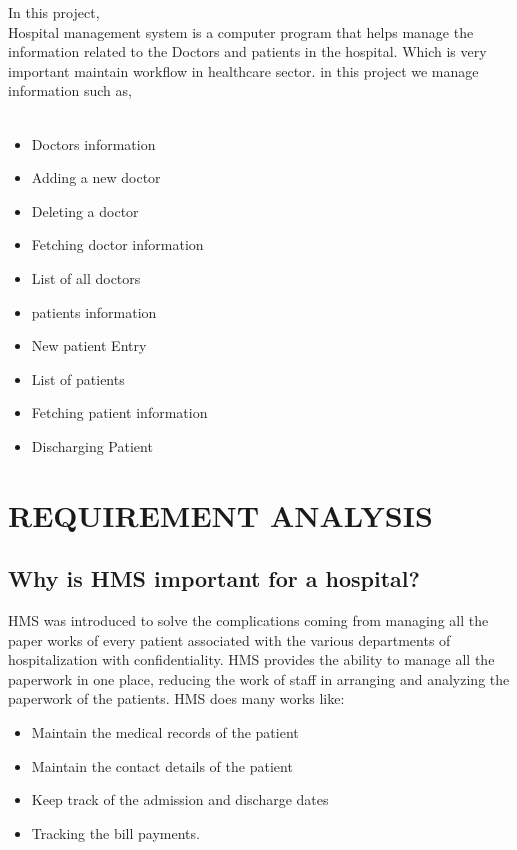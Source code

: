 \documentclass[a4paper, 14pt]{report}
\begin{document}
{In this project,\\
Hospital management system is a computer program that helps manage the information related to the Doctors and patients in the hospital. Which is very important maintain workflow in healthcare sector. in this project we manage information such as,\\\\



\begin{itemize}
\item Doctors information
\item Adding a new doctor
\item Deleting a doctor
\item Fetching doctor information 
\item List of all doctors
\item patients information
\item New patient Entry
\item List of patients
\item Fetching patient information
\item Discharging Patient
\end{itemize}


\newpage
\chapter{REQUIREMENT ANALYSIS}
\section{Why is HMS important for a hospital?}
HMS was introduced to solve the complications coming from managing all the paper works of every patient associated with the various departments of hospitalization with confidentiality. HMS provides the ability to manage all the paperwork in one place, reducing the work of staff in arranging and analyzing the paperwork of the patients. HMS does many works like:

\begin{itemize}
    \item Maintain the medical records of the patient
    \item Maintain the contact details of the patient
    \item Keep track of the admission and discharge dates
    \item Tracking the bill payments.
\end{itemize}
\\\\

}
\end{document}
